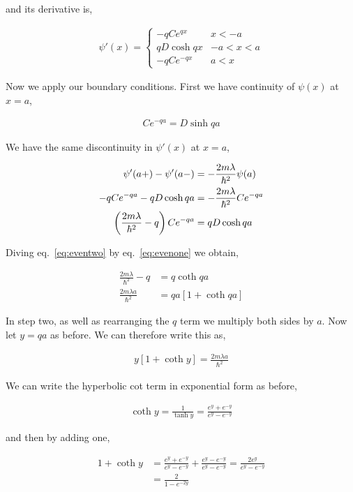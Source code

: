 \documentclass[11pt]{amsart}
\begin{document}
and its derivative is,

\begin{align*}
  \psi'(x) =
  \begin{cases}
    -qCe^{qx} & x < -a \\
    qD\cosh{qx} & -a < x < a \\
    -qCe^{-qx} & a < x
  \end{cases}
\end{align*}

Now we apply our boundary conditions. First we have continuity of $\psi(x)$ at $x = a$,

\begin{align}
  \label{eq:evenone}
  Ce^{-qa} = D\sinh{qa}
\end{align}

We have the same discontinuity in $\psi'(x)$ at $x = a$,

\begin{align}
  \label{eq:eventwo}
  \psi'(a+) - \psi'(a-) &= -\frac{2m\lambda}{\hbar^2}\psi(a) \notag\\
  -qCe^{-qa} - qD\cosh{qa} &= -\frac{2m\lambda}{\hbar^2}Ce^{-qa} \notag\\
  \left(\frac{2m\lambda}{\hbar^2} - q\right)Ce^{-qa} &= qD\cosh{qa}
\end{align}

Diving eq.~\ref{eq:eventwo} by eq.~\ref{eq:evenone} we obtain,

\begin{align*}
  \frac{2m\lambda}{\hbar^2} - q &= q\coth{qa} \\
  \frac{2m\lambda a}{\hbar^2} &= qa\left[1 + \coth{qa}\right]
\end{align*}

In step two, as well as rearranging the $q$ term we multiply both sides by $a$. Now let $y = qa$ as before. We can therefore write this as,

\begin{align*}
  y\left[1 + \coth{y}\right] = \frac{2m\lambda a}{\hbar^2}
\end{align*}

We can write the hyperbolic cot term in exponential form as before,

\begin{align*}
  \coth{y} = \frac{1}{\tanh{y}} = \frac{e^y + e^{-y}}{e^y - e^{-y}}
\end{align*}

and then by adding one,

\begin{align*}
  1 + \coth{y} &= \frac{e^y + e^{-y}}{e^y - e^{-y}}+\frac{e^y - e^{-y}}{e^y - e^{-y}} = \frac{2e^y}{e^y - e^{-y}} \\
               &= \frac{2}{1 - e^{-2y}}
\end{align*}
\end{document}
